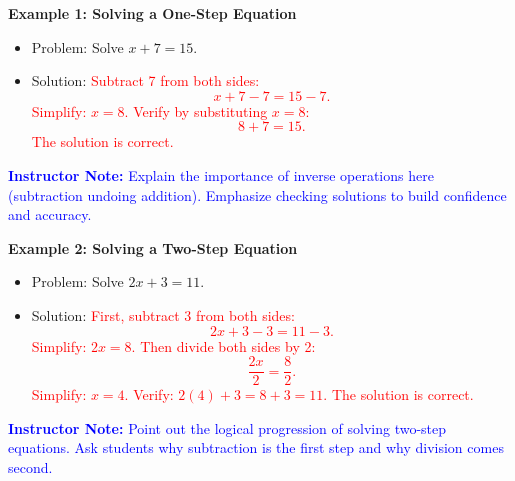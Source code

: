 \documentclass[12pt]{article}
\begin{document}
\begin{tcolorbox}[colframe=black!60, colback=white, 
coltitle=black, colbacktitle=black!15, fonttitle=\bfseries\Large, 
title=Examples, halign title=center, left=10pt, right=10pt, top=10pt, bottom=15pt]
\textbf{Example 1: Solving a One-Step Equation}
\begin{itemize}
    \item Problem: Solve \( x + 7 = 15 \).
    \item Solution: \textcolor{red}{Subtract 7 from both sides: 
    \[
    x + 7 - 7 = 15 - 7.
    \]
    Simplify: \( x = 8 \). Verify by substituting \( x = 8 \): 
    \[
    8 + 7 = 15.
    \]
    The solution is correct.}
\end{itemize}

\textcolor{blue}{\textbf{Instructor Note:} Explain the importance of inverse operations here (subtraction undoing addition). Emphasize checking solutions to build confidence and accuracy.}

\textbf{Example 2: Solving a Two-Step Equation}
\begin{itemize}
    \item Problem: Solve \( 2x + 3 = 11 \).
    \item Solution: \textcolor{red}{First, subtract 3 from both sides:
    \[
    2x + 3 - 3 = 11 - 3.
    \]
    Simplify: \( 2x = 8 \). Then divide both sides by 2:
    \[
    \frac{2x}{2} = \frac{8}{2}.
    \]
    Simplify: \( x = 4 \). Verify: \( 2(4) + 3 = 8 + 3 = 11 \). The solution is correct.}
\end{itemize}

\textcolor{blue}{\textbf{Instructor Note:} Point out the logical progression of solving two-step equations. Ask students why subtraction is the first step and why division comes second.}
\end{tcolorbox}

\end{document}
